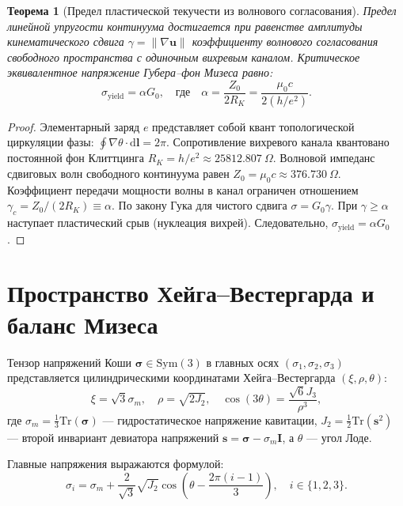 \documentclass[11pt,a4paper]{article}
\newtheorem{theorem}{Теорема}
\theoremstyle{definition}
\theoremstyle{remark}
\begin{document}
\begin{theorem}[Предел пластической текучести из волнового согласования]
\label{thm:yield_stress}
Предел линейной упругости континуума достигается при равенстве амплитуды кинематического сдвига $\gamma = \|\nabla \mathbf{u}\|$ коэффициенту волнового согласования свободного пространства с одиночным вихревым каналом. Критическое эквивалентное напряжение Губера--фон Мизеса равно:
\begin{equation}
    \sigma_{\mathrm{yield}} = \alpha G_0, \quad \text{где} \quad \alpha = \frac{Z_0}{2 R_K} = \frac{\mu_0 c}{2(h/e^2)}.
\end{equation}
\end{theorem}
\begin{proof}
Элементарный заряд $e$ представляет собой квант топологической циркуляции фазы: $\oint \nabla \theta \cdot \mathrm{d}\mathbf{l} = 2\pi$. Сопротивление вихревого канала квантовано постоянной фон Клиттцинга $R_K = h/e^2 \approx 25812.807\ \Omega$. Волновой импеданс сдвиговых волн свободного континуума равен $Z_0 = \mu_0 c \approx 376.730\ \Omega$. Коэффициент передачи мощности волны в канал ограничен отношением $\gamma_c = Z_0 / (2 R_K) \equiv \alpha$. По закону Гука для чистого сдвига $\sigma = G_0 \gamma$. При $\gamma \ge \alpha$ наступает пластический срыв (нуклеация вихрей). Следовательно, $\sigma_{\mathrm{yield}} = \alpha G_0$.
\end{proof}

\section{Пространство Хейга--Вестергарда и баланс Мизеса}
Тензор напряжений Коши $\boldsymbol{\sigma} \in \mathrm{Sym}(3)$ в главных осях $(\sigma_1, \sigma_2, \sigma_3)$ представляется цилиндрическими координатами Хейга--Вестергарда $(\xi, \rho, \theta)$:
\begin{equation}
    \xi = \sqrt{3} \sigma_m, \quad \rho = \sqrt{2 J_2}, \quad \cos(3\theta) = \frac{\sqrt{6} J_3}{\rho^3},
\end{equation}
где $\sigma_m = \frac{1}{3}\mathrm{Tr}(\boldsymbol{\sigma})$ — гидростатическое напряжение кавитации, $J_2 = \frac{1}{2}\mathrm{Tr}(\mathbf{s}^2)$ — второй инвариант девиатора напряжений $\mathbf{s} = \boldsymbol{\sigma} - \sigma_m \mathbf{I}$, а $\theta$ — угол Лоде.

Главные напряжения выражаются формулой:
\begin{equation}
    \sigma_i = \sigma_m + \frac{2}{\sqrt{3}} \sqrt{J_2} \cos\left( \theta - \frac{2\pi(i-1)}{3} \right), \quad i \in \{1, 2, 3\}.
\end{equation}
\end{document}

